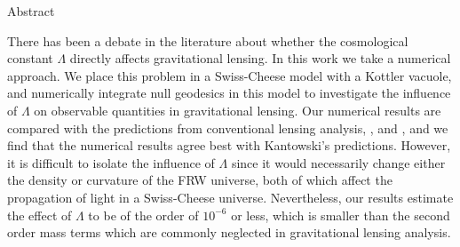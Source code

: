 \begin{center}
  \LARGE Abstract
\end{center}
%
\noindent
%

There has been a debate in the literature about whether the cosmological constant $\Lambda$ directly affects gravitational lensing. In this work we take a numerical approach. We place this problem in a Swiss-Cheese model with a Kottler vacuole, and numerically integrate null geodesics in this model to investigate the influence of $\Lambda$ on observable quantities in gravitational lensing. Our numerical results are compared with the predictions from conventional lensing analysis, \citet{rindler2007contribution}, and \citet{kantowski2010gravitational}, and we find that the numerical results agree best with Kantowski's predictions. However, it is difficult to isolate the influence of $\Lambda$ since it would necessarily change either the density or curvature of the FRW universe, both of which affect the propagation of light in a Swiss-Cheese universe. Nevertheless, our results estimate the effect of $\Lambda$ to be of the order of $10^{-6}$ or less, which is smaller than the second order mass terms which are commonly neglected in gravitational lensing analysis. 